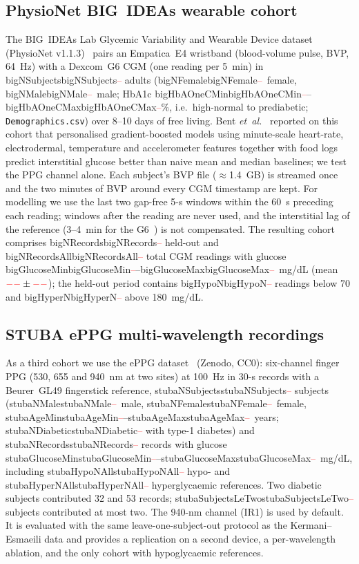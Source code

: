 \documentclass[journal]{IEEEtran}
\newcommand{\m}[1]{\ifcsname #1\endcsname\csname #1\endcsname\else\textcolor{red}{--}\fi}
\begin{document}
\subsection{PhysioNet BIG~IDEAs wearable cohort}
\label{sec:bigideas_data}
The BIG~IDEAs Lab Glycemic Variability and Wearable Device dataset
(PhysioNet v1.1.3)~\cite{cho2026bigideas,bent2021} pairs an Empatica~E4
wristband (blood-volume pulse, BVP, 64~Hz) with a Dexcom~G6 CGM (one reading
per 5~min) in \m{bigNSubjects} adults (\m{bigNFemale}~female, \m{bigNMale}~male;
HbA1c \m{bigHbAOneCMin}--\m{bigHbAOneCMax}\%, i.e.\ high-normal to
prediabetic; \texttt{Demographics.csv}) over 8--10 days of free living.  Bent \emph{et~al.}~\cite{bent2021} reported on this cohort
that personalised gradient-boosted models using minute-scale heart-rate,
electrodermal, temperature and accelerometer features together with food
logs predict interstitial glucose better than naive mean and median
baselines; we test the PPG channel alone.  Each subject's BVP file
($\approx$1.4~GB) is streamed once and the two minutes of BVP around every
CGM timestamp are kept.  For modelling we use the last two gap-free 5-s
windows within the 60~s preceding each reading; windows after the reading
are never used, and the interstitial lag of the reference (3--4~min for the
G6~\cite{welsh2022lag}) is not compensated.  The resulting cohort comprises
\m{bigNRecords} held-out and \m{bigNRecordsAll} total CGM readings with
glucose \m{bigGlucoseMin}--\m{bigGlucoseMax}~mg/dL (mean
$\m{bigGlucoseMean}\pm\m{bigGlucoseStd}$); the held-out period contains
\m{bigHypoN} readings below 70 and \m{bigHyperN} above 180~mg/dL.

\subsection{STUBA ePPG multi-wavelength recordings}
\label{sec:stuba}
As a third cohort we use the ePPG dataset~\cite{stuba2026} (Zenodo, CC0):
six-channel finger PPG (530, 655 and 940~nm at two sites) at 100~Hz in 30-s
records with a Beurer~GL49 fingerstick reference, \m{stubaNSubjects} subjects
(\m{stubaNMale}~male, \m{stubaNFemale}~female, \m{stubaAgeMin}--\m{stubaAgeMax}~years;
\m{stubaNDiabetic} with type-1 diabetes) and \m{stubaNRecords} records with
glucose \m{stubaGlucoseMin}--\m{stubaGlucoseMax}~mg/dL, including
\m{stubaHypoNAll} hypo- and \m{stubaHyperNAll} hyperglycaemic references.
Two diabetic subjects contributed 32 and 53 records; \m{stubaSubjectsLeTwo}
subjects contributed at most two.  The 940-nm channel (IR1) is used by
default.  It is evaluated with the same leave-one-subject-out protocol as the
Kermani--Esmaeili data and provides a replication on a second device, a
per-wavelength ablation, and the only cohort with hypoglycaemic references.
\end{document}
